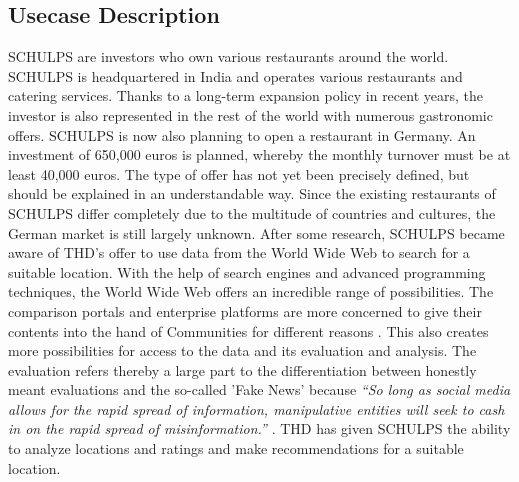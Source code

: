 \subsection{Usecase Description}
\label{subsec:usecase}
SCHULPS are investors who own various restaurants around the world. SCHULPS is headquartered in India and operates various restaurants and catering services. Thanks to a long-term expansion policy in recent years, the investor is also represented in the rest of the world with numerous gastronomic offers. SCHULPS is now also planning to open a restaurant in Germany. An investment of 650,000 euros is planned, whereby the monthly turnover must be at least 40,000 euros. The type of offer has not yet been precisely defined, but should be explained in an understandable way. Since the existing restaurants of SCHULPS differ completely due to the multitude of countries and cultures, the German market is still largely unknown. After some research, SCHULPS became aware of THD's offer to use data from the World Wide Web to search for a suitable location. With the help of search engines and advanced programming techniques, the World Wide Web offers an incredible range of possibilities. The comparison portals and enterprise platforms are more concerned to give their contents into the hand of Communities for different reasons . This also creates more possibilities for access to the data and its evaluation and analysis. The evaluation refers thereby a large part to the differentiation between honestly meant evaluations and the so-called 'Fake News' because \textit{``So long as social media allows for the rapid spread of information, manipulative entities will seek to cash in on the rapid spread of misinformation.''} .
THD has given SCHULPS the ability to analyze locations and ratings and make recommendations for a suitable location.
